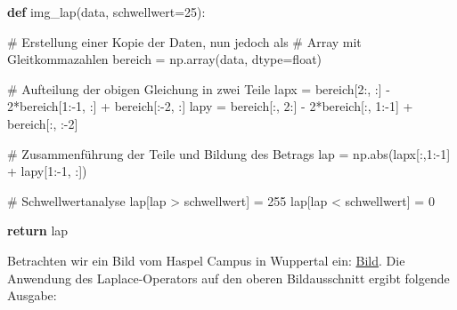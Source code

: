 \documentclass[
  letterpaper,
  DIV=11,
  numbers=noendperiod]{scrreprt}
\newenvironment{Shaded}{\begin{snugshade}}{\end{snugshade}}
\newcommand{\BuiltInTok}[1]{\textcolor[rgb]{0.00,0.23,0.31}{#1}}
\newcommand{\CommentTok}[1]{\textcolor[rgb]{0.37,0.37,0.37}{#1}}
\newcommand{\ControlFlowTok}[1]{\textcolor[rgb]{0.00,0.23,0.31}{\textbf{#1}}}
\newcommand{\DecValTok}[1]{\textcolor[rgb]{0.68,0.00,0.00}{#1}}
\newcommand{\KeywordTok}[1]{\textcolor[rgb]{0.00,0.23,0.31}{\textbf{#1}}}
\newcommand{\NormalTok}[1]{\textcolor[rgb]{0.00,0.23,0.31}{#1}}
\newcommand{\OperatorTok}[1]{\textcolor[rgb]{0.37,0.37,0.37}{#1}}
\begin{document}
\begin{Shaded}
\begin{Highlighting}[]
\KeywordTok{def}\NormalTok{ img\_lap(data, schwellwert}\OperatorTok{=}\DecValTok{25}\NormalTok{):}
    
    \CommentTok{\# Erstellung einer Kopie der Daten, nun jedoch als}
    \CommentTok{\# Array mit Gleitkommazahlen}
\NormalTok{    bereich }\OperatorTok{=}\NormalTok{ np.array(data, dtype}\OperatorTok{=}\BuiltInTok{float}\NormalTok{)}
    
    \CommentTok{\# Aufteilung der obigen Gleichung in zwei Teile}
\NormalTok{    lapx }\OperatorTok{=}\NormalTok{ bereich[}\DecValTok{2}\NormalTok{:, :] }\OperatorTok{{-}} \DecValTok{2}\OperatorTok{*}\NormalTok{bereich[}\DecValTok{1}\NormalTok{:}\OperatorTok{{-}}\DecValTok{1}\NormalTok{, :] }\OperatorTok{+}\NormalTok{ bereich[:}\OperatorTok{{-}}\DecValTok{2}\NormalTok{, :]}
\NormalTok{    lapy }\OperatorTok{=}\NormalTok{ bereich[:, }\DecValTok{2}\NormalTok{:] }\OperatorTok{{-}} \DecValTok{2}\OperatorTok{*}\NormalTok{bereich[:, }\DecValTok{1}\NormalTok{:}\OperatorTok{{-}}\DecValTok{1}\NormalTok{] }\OperatorTok{+}\NormalTok{ bereich[:, :}\OperatorTok{{-}}\DecValTok{2}\NormalTok{]}
    
    \CommentTok{\# Zusammenführung der Teile und Bildung des Betrags}
\NormalTok{    lap }\OperatorTok{=}\NormalTok{ np.}\BuiltInTok{abs}\NormalTok{(lapx[:,}\DecValTok{1}\NormalTok{:}\OperatorTok{{-}}\DecValTok{1}\NormalTok{] }\OperatorTok{+}\NormalTok{ lapy[}\DecValTok{1}\NormalTok{:}\OperatorTok{{-}}\DecValTok{1}\NormalTok{, :])}
    
    \CommentTok{\# Schwellwertanalyse}
\NormalTok{    lap[lap }\OperatorTok{\textgreater{}}\NormalTok{ schwellwert] }\OperatorTok{=} \DecValTok{255}
\NormalTok{    lap[lap }\OperatorTok{\textless{}}\NormalTok{ schwellwert] }\OperatorTok{=} \DecValTok{0}
    
    \ControlFlowTok{return}\NormalTok{ lap}
\end{Highlighting}
\end{Shaded}

Betrachten wir ein Bild vom Haspel Campus in Wuppertal ein:
\href{https://firedynamics.github.io/LectureComputerScience/_downloads/592f1fc843fc7c01bdcad17bf85ec15c/campus_haspel.jpeg}{Bild}.
Die Anwendung des Laplace-Operators auf den oberen Bildausschnitt ergibt
folgende Ausgabe:
\end{document}
